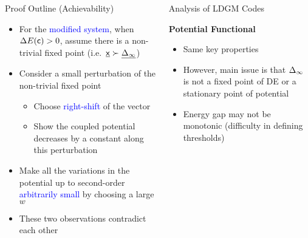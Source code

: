 \documentclass{beamer}
\newlength{\twocolwid}
\newlength{\threecolwid}
\begin{document}
\begin{frame}
\begin{columns}[t]
\begin{column}{\twocolwid}
    \vspace{2cm}
    \begin{block}{Proof Outline (Achievability)}
      \begin{itemize}
        \vspace{0.4cm}
      \item For the \textcolor{blue}{modified system}, when $\Delta E(\mathsf{c})>0$, assume there is a non-trivial fixed point (i.e.~$\underline{\mathsf{x}} \succ \underline{\Delta_{\infty}}$)
        \vspace{0.4cm}
      \item\vspace{0.75cm} Consider a small perturbation of the non-trivial fixed point
        \begin{itemize}
        \item\vspace{0.75cm} Choose \textcolor{blue}{right-shift} of the vector
        \item\vspace{0.75cm} Show the coupled potential \alert{decreases by a constant} along this perturbation
        \end{itemize}
      \item\vspace{0.75cm} Make all the variations in the potential up to second-order \textcolor{blue}{arbitrarily small} by choosing a \alert{large $w$}
      \item\vspace{0.75cm} These two observations \alert{contradict} each other
      \end{itemize}
    \end{block}
  \end{column}

  \begin{column}{\threecolwid}
    \vspace{0.75cm}
    \begin{block}{Analysis of LDGM Codes}
      \vspace{0.75cm}
      \setlength\tikzheight{14.5cm}
      \setlength\tikzwidth{19cm}
      

      \vspace{1.25cm}
      \textcolor{jblue}{\bf Potential Functional}

      \begin{itemize}
      \item\vspace{0.75cm} Same key properties
      \item\vspace{0.75cm} However, main issue is that $\Delta_\infty$ is not a fixed point of DE or a stationary point of potential
      \item\vspace{0.75cm} Energy gap \alert{may not} be monotonic (difficulty in defining thresholds)
      \end{itemize}


\end{block}
\end{column}
\end{columns}
\end{frame}
\end{document}
